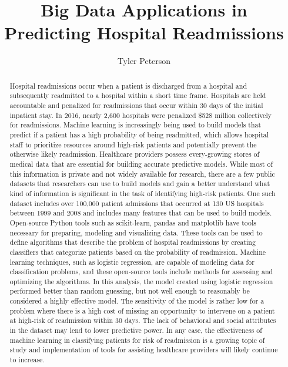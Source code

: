 \documentclass[sigconf]{acmart}
\begin{document}
\title{Big Data Applications in Predicting Hospital Readmissions}

\author{Tyler Peterson}

\renewcommand{\shortauthors}{G. v. Laszewski}

\begin{abstract}

  Hospital readmissions occur when a patient is discharged from a hospital and subsequently readmitted to a hospital within a short time frame. Hospitals are held accountable and penalized for readmissions that occur within 30 days of the initial inpatient stay. In 2016, nearly 2,600 hospitals were penalized \$528 million collectively for readmissions. Machine learning is increasingly being used to build models that predict if a patient has a high probability of being readmitted, which allows hospital staff to prioritize resources around high-risk patients and potentially prevent the otherwise likely readmission. Healthcare providers possess every-growing stores of medical data that are essential for building accurate predictive models. While most of this information is private and not widely available for research, there are a few public datasets that researchers can use to build models and gain a better understand what kind of information is significant in the task of identifying high-risk patients. One such dataset includes over 100,000 patient admissions that occurred at 130 US hospitals between 1999 and 2008 and includes many features that can be used to build models. Open-source Python tools such as scikit-learn, pandas and matplotlib have tools necessary for preparing, modeling and visualizing data. These tools can be used to define algorithms that describe the problem of hospital readmissions by creating classifiers that categorize patients based on the probability of readmission. Machine learning techniques, such as logistic regression, are capable of modeling data for classification problems, and these open-source tools include methods for assessing and optimizing the algorithms. In this analysis, the model created using logistic regression performed better than random guessing, but not well enough to reasonably be considered a highly effective model. The sensitivity of the model is rather low for a problem where there is a high cost of missing an opportunity to intervene on a patient at high-risk of readmission within 30 days. The lack of behavioral and social attributes in the dataset may lend to lower predictive power. In any case, the effectiveness of machine learning in classifying patients for risk of readmission is a growing topic of study and implementation of tools for assisting healthcare providers will likely continue to increase.
 
\end{abstract}
\end{document}
